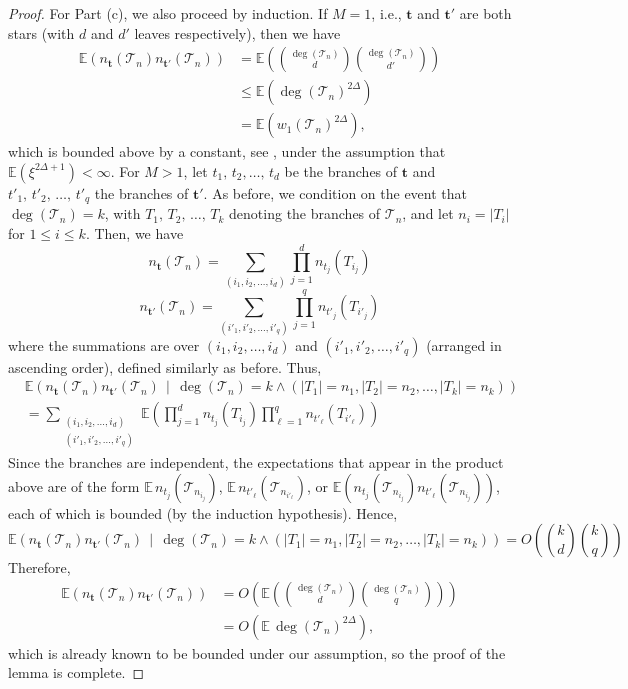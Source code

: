 \documentclass[article]{amsart}
\newcommand{\tc}{\mathcal{T}}
\newcommand{\st}{\textbf{t}}
\theoremstyle{definition}
\theoremstyle{remark}
\begin{document}
\begin{proof}
For Part (c), we also proceed by induction. If $M = 1$, i.e., $\st$ and $\st'$ are both stars (with $d$ and $d'$ leaves respectively), then we have
\begin{align*}
	\mathbb{E}(n_{\st}(\tc_n) n_{\st'}(\tc_n)) 
	& = \mathbb{E} \left( \binom{\deg(\tc_n)}{d} \binom{\deg(\tc_n)}{d'} \right) \\[.5em]
	& \leq \mathbb{E} \left( \deg(\tc_n)^{2\Delta} \right) \\
	& = \mathbb{E} \left( w_1(\tc_n)^{2\Delta} \right),
\end{align*}
which is bounded above by a constant, see \cite[Lemma 2.2]{J06}, under the assumption that $\mathbb{E}(\xi^{2\Delta + 1}) < \infty$.
For $M > 1$, let $t_1,\, t_2, \dots,\, t_d$ be the branches of $\st$ and $t'_1,\, t'_2,\, \dots,\, t'_q$ the branches of $\st'$. As before, we condition on the event that $\deg(\tc_n) = k$, with $T_1,\, T_2,\, \dots,\, T_k$ denoting the branches of $\tc_n$, and let $n_i = |T_i|$ for $1 \leq i \leq k$. Then, we have
\[
n_{\st}(\tc_n) = \sum_{(i_1,i_2,\dots,i_d)} \prod_{j=1}^{d} n_{t_j}(T_{i_j})
\]
\[
n_{\st'}(\tc_n) = \sum_{(i'_1,i'_2,\dots,i'_q)} \prod_{j=1}^{q} n_{t'_j}(T_{i'_j})
\]
where the summations are over $(i_1,i_2,\dots,i_d)$ and $(i'_1,i'_2,\dots,i'_q)$ (arranged in ascending order), defined similarly as before. Thus,
\begin{align*}
&\mathbb{E}\left(n_{\st}(\tc_n)n_{\st'}(\tc_n)\,\middle|\, \deg(\tc_n)=k \wedge (|T_1|=n_1, |T_2|=n_2, \dots, |T_k|=n_k)\right) \\
&= \sum_{\substack{(i_1,i_2,\dots,i_d)\\(i'_1,i'_2,\dots,i'_q)}} \mathbb{E} \left( \prod_{j=1}^{d} n_{t_j}(T_{i_j}) \prod_{\ell=1}^{q} n_{t'_\ell}(T_{i'_\ell}) \right)
\end{align*}
Since the branches are independent, the expectations that appear in the product above are of the form $\mathbb{E} \, n_{t_j}(\tc_{n_{i_j}})$, $\mathbb{E} \, n_{t'_\ell}(\tc_{n_{i'_\ell}})$, or $\mathbb{E} \left(n_{t_j}(\tc_{n_{i_j}}) n_{t'_\ell}(\tc_{n_{i_j}})\right)$, each of which is bounded (by the induction hypothesis). Hence,
\[
\mathbb{E}\left(n_{\st}(\tc_n)n_{\st'}(\tc_n)\,\middle|\, \deg(\tc_n)=k \wedge (|T_1|=n_1, |T_2|=n_2, \dots, |T_k|=n_k)\right) = O\left(\binom{k}{d}\binom{k}{q}\right)
\]
Therefore,
\begin{align*}
\mathbb{E}\left(n_{\st}(\tc_n)n_{\st'}(\tc_n)\right)
&= O\left(\mathbb{E} \left(\binom{\deg(\tc_n)}{d}\binom{\deg(\tc_n)}{q}\right)\right) \\[.5em]
&= O\left(\mathbb{E} \, \deg(\tc_n)^{2\Delta}\right),
\end{align*}
which is already known to be bounded under our assumption, so the proof of the lemma is complete.
\end{proof}
\end{document}
